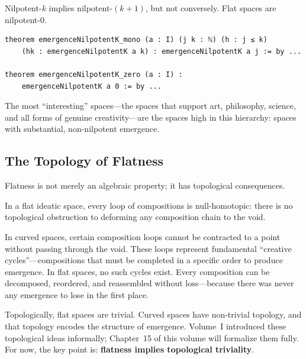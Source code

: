 \begin{theorem}
\label{thm:nilpotency-hierarchy}
Nilpotent-$k$ implies nilpotent-$(k+1)$, but not conversely. Flat spaces are
nilpotent-0.
\end{theorem}

\begin{lstlisting}[caption={Nilpotency hierarchy (IDT\_v3\_Emergence.lean)}]
theorem emergenceNilpotentK_mono (a : I) (j k : ℕ) (h : j ≤ k)
    (hk : emergenceNilpotentK a k) : emergenceNilpotentK a j := by ...

theorem emergenceNilpotentK_zero (a : I) :
    emergenceNilpotentK a 0 := by ...
\end{lstlisting}

The most ``interesting'' spaces---the spaces that support art, philosophy,
science, and all forms of genuine creativity---are the spaces high in this
hierarchy: spaces with substantial, non-nilpotent emergence.

\subsection{The Topology of Flatness}

Flatness is not merely an algebraic property; it has topological consequences.

\begin{theorem}
\label{thm:flat-contractible}
In a flat ideatic space, every loop of compositions is null-homotopic: there
is no topological obstruction to deforming any composition chain to the void.
\end{theorem}

\begin{interpretation}
In curved spaces, certain composition loops cannot be contracted to a point
without passing through the void. These loops represent fundamental
``creative cycles''---compositions that must be completed in a specific order
to produce emergence. In flat spaces, no such cycles exist. Every composition
can be decomposed, reordered, and reassembled without loss---because there
was never any emergence to lose in the first place.

Topologically, flat spaces are trivial. Curved spaces have non-trivial
topology, and that topology encodes the structure of emergence. Volume~I
introduced these topological ideas informally; Chapter~15 of this volume will
formalize them fully. For now, the key point is: \textbf{flatness implies
topological triviality}.
\end{interpretation}

